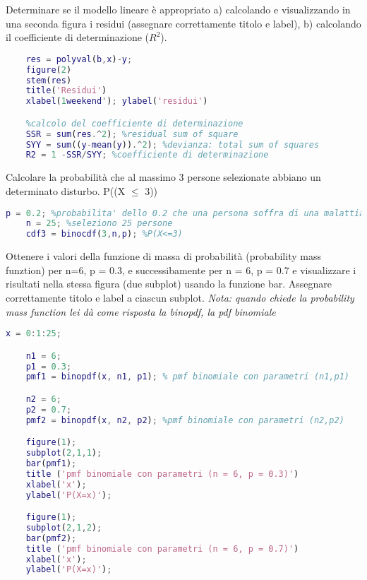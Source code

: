 \documentclass{article}
\begin{document}
Determinare se il modello lineare è appropriato a) calcolando e visualizzando in una seconda figura i residui (assegnare correttamente titolo e label),
b) calcolando il coefficiente di determinazione ($R^2$).

\begin{lstlisting}[language=Matlab]
    %calcolo dei residui e visualizzazione
    res = polyval(b,x)-y;
    figure(2)
    stem(res)
    title('Residui')
    xlabel(1weekend'); ylabel('residui')

    %calcolo del coefficiente di determinazione
    SSR = sum(res.^2); %residual sum of square
    SYY = sum((y-mean(y)).^2); %devianza: total sum of squares
    R2 = 1 -SSR/SYY; %coefficiente di determinazione
\end{lstlisting}

Calcolare la probabilità che al massimo 3 persone selezionate abbiano un determinato disturbo. P((X $\leq$ 3))

\begin{lstlisting}[language=Matlab]
    p = 0.2; %probabilita' dello 0.2 che una persona soffra di una malattia
    n = 25; %seleziono 25 persone
    cdf3 = binocdf(3,n,p); %P(X<=3)
\end{lstlisting}

Ottenere i valori della funzione di massa di probabilità (probability mass funztion) per n=6,
p = 0.3, e successibamente per n = 6, p = 0.7 e visualizzare i risultati nella stessa figura (due subplot) usando la funzione bar. Assegnare correttamente titolo e label a ciascun subplot.
\textit{Nota: quando chiede la probability mass function lei dà come risposta la binopdf, la pdf binomiale}
\begin{lstlisting}[language=Matlab]
    x = 0:1:25;

    n1 = 6;
    p1 = 0.3;
    pmf1 = binopdf(x, n1, p1); % pmf binomiale con parametri (n1,p1)

    n2 = 6;
    p2 = 0.7;
    pmf2 = binopdf(x, n2, p2); %pmf binomiale con parametri (n2,p2)

    figure(1);
    subplot(2,1,1);
    bar(pmf1);
    title ('pmf binomiale con parametri (n = 6, p = 0.3)')
    xlabel('x');
    ylabel('P(X=x)');

    figure(1);
    subplot(2,1,2);
    bar(pmf2);
    title ('pmf binomiale con parametri (n = 6, p = 0.7)')
    xlabel('x');
    ylabel('P(X=x)');
\end{lstlisting}
\end{document}
